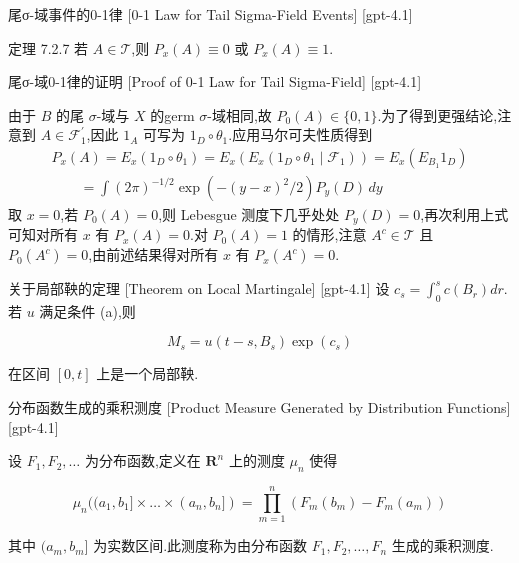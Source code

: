 \documentclass[UTF8]{ctexart}
\begin{document}
    
    
    \begin{thm}
        {尾σ-域事件的0-1律}
        [0-1 Law for Tail Sigma-Field Events]
        [gpt-4.1]
        
定理 7.2.7 若 $A \in \mathcal{T}$,则 $P_{x}(A) \equiv 0$ 或 $P_{x}(A) \equiv 1$.

    \end{thm}
    
    
    
    \begin{prf}
        {尾σ-域0-1律的证明}
        [Proof of 0-1 Law for Tail Sigma-Field]
        [gpt-4.1]
        
由于 $B$ 的尾 $\sigma$-域与 $X$ 的germ $\sigma$-域相同,故 $P_{0}(A) \in \{0, 1\}$.为了得到更强结论,注意到 $A \in \mathcal{F}_{1}^{\prime}$,因此 $1_{A}$ 可写为 $1_{D} \circ \theta_{1}$.应用马尔可夫性质得到
\[
\begin{array}{l}
P_{x}(A) = E_{x}(1_{D} \circ \theta_{1}) = E_{x}( E_{x}(1_{D} \circ \theta_{1} \mid \mathcal{F}_{1}) ) = E_{x}( E_{B_{1}} 1_{D}) \\
\qquad = \int (2\pi)^{-1/2} \exp( - (y-x)^{2}/2 ) P_{y}(D) \, dy
\end{array}
\]
取 $x = 0$,若 $P_{0}(A) = 0$,则 Lebesgue 测度下几乎处处 $P_{y}(D) = 0$,再次利用上式可知对所有 $x$ 有 $P_{x}(A) = 0$.对 $P_{0}(A) = 1$ 的情形,注意 $A^{c} \in \mathcal{T}$ 且 $P_{0}(A^{c}) = 0$,由前述结果得对所有 $x$ 有 $P_{x}(A^{c}) = 0$.

    \end{prf}
    
    
    
    \begin{thm}
        {关于局部鞅的定理}
        [Theorem on Local Martingale]
        [gpt-4.1]
        设 $c _ { s } = \int _ { 0 } ^ { s } c ( B _ { r } ) d r$.若 $u$ 满足条件 (a),则

\[
M _ { s } = u ( t - s , B _ { s } ) \exp ( c _ { s } )
\]

在区间 $[ 0 , t ]$ 上是一个局部鞅.

    \end{thm}
    
    
    
    \begin{dfn}
        {分布函数生成的乘积测度}
        [Product Measure Generated by Distribution Functions]
        [gpt-4.1]
        
设 $F_{1}, F_{2}, \ldots$ 为分布函数,定义在 $\mathbf{R}^{n}$ 上的测度 $\mu_{n}$ 使得

\[
\mu_{n}((a_{1}, b_{1}] \times \ldots \times (a_{n}, b_{n}]) = \prod_{m=1}^{n}(F_{m}(b_{m}) - F_{m}(a_{m}))
\]

其中 $(a_{m}, b_{m}]$ 为实数区间.此测度称为由分布函数 $F_1, F_2, \ldots, F_n$ 生成的乘积测度.

    \end{dfn}
    
\end{document}
